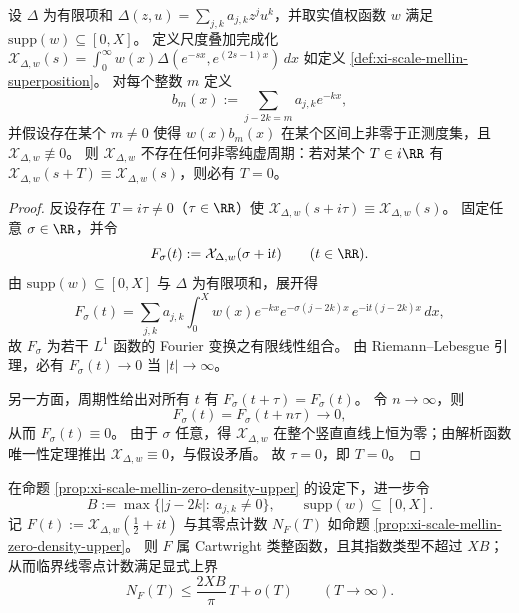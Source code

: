 \begin{proposition}\label{prop:xi-scale-mellin-no-nonzero-imag-period}
设 \(\Delta\) 为有限项和
\(
\Delta(z,u)=\sum_{j,k}a_{j,k}z^j u^k
\)，并取实值权函数 \(w\) 满足 \(\mathrm{supp}(w)\subseteq[0,X]\)。
定义尺度叠加完成化
\(
\mathcal X_{\Delta,w}(s)=\int_0^\infty w(x)\Delta(e^{-sx},e^{(2s-1)x})\,dx
\)
如定义 \ref{def:xi-scale-mellin-superposition}。
对每个整数 \(m\) 定义
\[
b_m(x):=\sum_{j-2k=m}a_{j,k}e^{-kx},
\]
并假设存在某个 \(m\neq 0\) 使得 \(w(x)b_m(x)\) 在某个区间上非零于正测度集，且 \(\mathcal X_{\Delta,w}\not\equiv 0\)。
则 \(\mathcal X_{\Delta,w}\) 不存在任何非零纯虚周期：若对某个 \(T\in i\RR\) 有
\(
\mathcal X_{\Delta,w}(s+T)\equiv \mathcal X_{\Delta,w}(s)
\)，则必有 \(T=0\)。
\end{proposition}

\begin{proof}
反设存在 \(T=i\tau\neq 0\)（\(\tau\in\RR\)）使 \(\mathcal X_{\Delta,w}(s+i\tau)\equiv \mathcal X_{\Delta,w}(s)\)。
固定任意 \(\sigma\in\RR\)，并令
\[
F_\sigma(t):=\mathcal X_{\Delta,w}(\sigma+\mathrm{i}t)\qquad(t\in\RR).
\]
由 \(\mathrm{supp}(w)\subseteq[0,X]\) 与 \(\Delta\) 为有限项和，展开得
\[
F_\sigma(t)
=\sum_{j,k}a_{j,k}\int_0^X w(x)e^{-kx}e^{-\sigma(j-2k)x}\,e^{-\mathrm{i}t(j-2k)x}\,dx,
\]
故 \(F_\sigma\) 为若干 \(L^1\) 函数的 Fourier 变换之有限线性组合。
由 Riemann--Lebesgue 引理，必有 \(F_\sigma(t)\to 0\) 当 \(|t|\to\infty\)。
\par
另一方面，周期性给出对所有 \(t\) 有 \(F_\sigma(t+\tau)=F_\sigma(t)\)。
令 \(n\to\infty\)，则
\[
F_\sigma(t)=F_\sigma(t+n\tau)\longrightarrow 0,
\]
从而 \(F_\sigma(t)\equiv 0\)。
由于 \(\sigma\) 任意，得 \(\mathcal X_{\Delta,w}\) 在整个竖直直线上恒为零；由解析函数唯一性定理推出 \(\mathcal X_{\Delta,w}\equiv 0\)，与假设矛盾。
故 \(\tau=0\)，即 \(T=0\)。
\end{proof}

\begin{proposition}\label{prop:xi-scale-mellin-cartwright-explicit-type}
在命题 \ref{prop:xi-scale-mellin-zero-density-upper} 的设定下，进一步令
\[
B:=\max\{|j-2k|:\ a_{j,k}\neq 0\},
\qquad
\mathrm{supp}(w)\subseteq[0,X].
\]
记
\(
F(t):=\mathcal X_{\Delta,w}\!\left(\tfrac12+it\right)
\)
与其零点计数 \(N_F(T)\) 如命题 \ref{prop:xi-scale-mellin-zero-density-upper}。
则 \(F\) 属 Cartwright 类整函数，且其指数类型不超过 \(XB\)；
从而临界线零点计数满足显式上界
\[
N_F(T)\le \frac{2XB}{\pi}\,T+o(T)\qquad(T\to\infty).
\]
\end{proposition}

